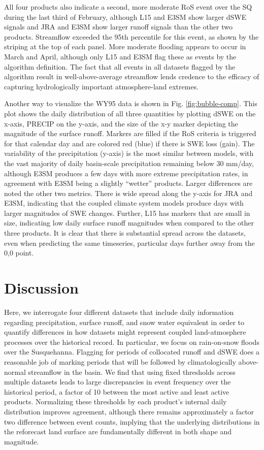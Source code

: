 \documentclass[draft]{agujournal2019}
\begin{document}
All four products also indicate a second, more moderate RoS event over the SQ during the last third of February, although L15 and E3SM show larger dSWE signals and JRA and E3SM show larger runoff signals than the other two products. Streamflow exceeded the 95th percentile for this event, as shown by the striping at the top of each panel. More moderate flooding appears to occur in March and April, although only L15 and E3SM flag these as events by the algorithm definition. The fact that all events in all datasets flagged by the algorithm result in well-above-average streamflow lends credence to the efficacy of capturing hydrologically important atmosphere-land extremes.

Another way to visualize the WY95 data is shown in Fig. \ref{fig:bubble-comp}.  This plot shows the daily distribution of all three quantities by plotting dSWE on the x-axis, PRECIP on the y-axis, and the size of the x-y marker depicting the magnitude of the surface runoff. Markers are filled if the RoS criteria is triggered for that calendar day and are colored red (blue) if there is SWE loss (gain). The variability of the precipitation (y-axis) is the most similar between models, with the vast majority of daily basin-scale precipitation remaining below 30 mm/day, although E3SM produces a few days with more extreme precipitation rates, in agreement with E3SM being a slightly ``wetter'' products. Larger differences are noted the other two metrics. There is wide spread along the y-axis for JRA and E3SM, indicating that the coupled climate system models produce days with larger magnitudes of SWE changes. Further, L15 has markers that are small in size, indicating low daily surface runoff magnitudes when compared to the other three products. It is clear that there is substantial spread across the datasets, even when predicting the same timeseries, particular days further away from the 0,0 point.

\section{Discussion}

Here, we interrogate four different datasets that include daily information regarding precipitation, surface runoff, and snow water equivalent in order to quantify differences in how datasets might represent coupled land-atmosphere processes over the historical record. In particular, we focus on rain-on-snow floods over the Susquehanna. Flagging for periods of collocated runoff and dSWE does a reasonable job of marking periods that will be followed by climatologically above-normal streamflow in the basin. We find that using fixed thresholds across multiple datasets leads to large discrepancies in event frequency over the historical period, a factor of 10 between the most active and least active products. Normalizing these thresholds by each product's internal daily distribution improves agreement, although there remains approximately a factor two difference between event counts, implying that the underlying distributions in the reforecast land surface are fundamentally different in both shape and magnitude.
\end{document}
